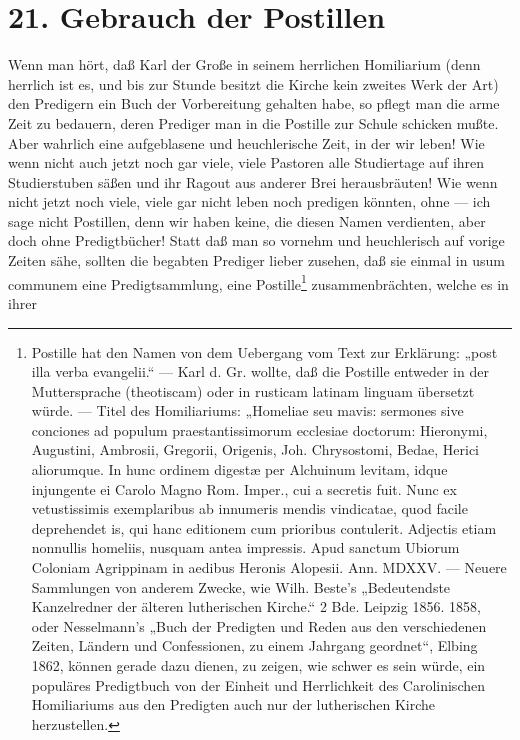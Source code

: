 \section{21. Gebrauch der Postillen}

Wenn man hört, daß Karl der Große in seinem herrlichen Homiliarium (denn herrlich ist es, und bis zur Stunde besitzt die Kirche kein zweites Werk der Art) den Predigern
ein Buch der Vorbereitung gehalten habe, so pflegt man die arme Zeit zu bedauern, deren Prediger man in die Postille zur Schule schicken mußte. Aber wahrlich eine aufgeblasene und heuchlerische Zeit, in der wir leben! Wie wenn nicht auch jetzt noch gar viele, viele Pastoren alle Studiertage auf ihren Studierstuben säßen und ihr Ragout aus anderer Brei herausbräuten! Wie wenn nicht jetzt noch viele, viele gar nicht leben noch predigen könnten, ohne — ich sage nicht Postillen, denn wir haben keine, die diesen Namen verdienten, aber doch ohne Predigtbücher! Statt daß man so vornehm und heuchlerisch auf vorige Zeiten sähe, sollten die begabten Prediger lieber zusehen, daß sie einmal in usum communem eine Predigtsammlung, eine Postille\footnote{Postille hat den Namen von dem Uebergang vom Text zur Erklärung: „post illa verba evangelii.“ — Karl d. Gr. wollte, daß die Postille entweder in der Muttersprache (theotiscam) oder in rusticam latinam linguam übersetzt würde. — Titel des Homiliariums: „Homeliae seu mavis: sermones sive conciones ad populum praestantissimorum ecclesiae doctorum: Hieronymi, Augustini, Ambrosii, Gregorii, Origenis, Joh. Chrysostomi, Bedae, Herici aliorumque. In hunc ordinem digestæ per Alchuinum levitam, idque injungente ei Carolo Magno Rom. Imper., cui a secretis fuit. Nunc ex vetustissimis exemplaribus ab innumeris mendis vindicatae, quod facile deprehendet is, qui hanc editionem cum prioribus contulerit. Adjectis etiam nonnullis homeliis, nusquam antea impressis. Apud sanctum Ubiorum Coloniam Agrippinam in aedibus Heronis Alopesii. Ann. MDXXV. — Neuere Sammlungen von anderem Zwecke, wie Wilh. Beste’s „Bedeutendste Kanzelredner der älteren lutherischen Kirche.“ 2 Bde. Leipzig 1856. 1858, oder Nesselmann’s „Buch der Predigten und Reden aus den verschiedenen Zeiten, Ländern und Confessionen, zu einem Jahrgang geordnet“, Elbing 1862, können gerade dazu dienen, zu zeigen, wie schwer es sein würde, ein populäres Predigtbuch von der Einheit und Herrlichkeit des Carolinischen Homiliariums aus den Predigten auch nur der lutherischen Kirche herzustellen.} zusammenbrächten, welche es in ihrer
